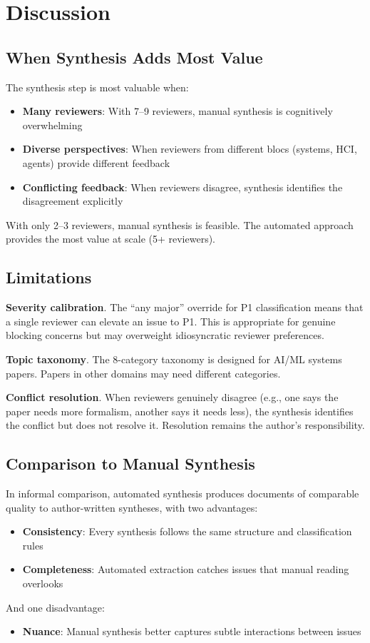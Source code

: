 \section{Discussion}

\subsection{When Synthesis Adds Most Value}

The synthesis step is most valuable when:
\begin{itemize}
    \item \textbf{Many reviewers}: With 7--9 reviewers, manual synthesis is cognitively overwhelming
    \item \textbf{Diverse perspectives}: When reviewers from different blocs (systems, HCI, agents) provide different feedback
    \item \textbf{Conflicting feedback}: When reviewers disagree, synthesis identifies the disagreement explicitly
\end{itemize}

With only 2--3 reviewers, manual synthesis is feasible. The automated approach provides the most value at scale (5+ reviewers).

\subsection{Limitations}

\textbf{Severity calibration}. The ``any major'' override for P1 classification means that a single reviewer can elevate an issue to P1. This is appropriate for genuine blocking concerns but may overweight idiosyncratic reviewer preferences.

\textbf{Topic taxonomy}. The 8-category taxonomy is designed for AI/ML systems papers. Papers in other domains may need different categories.

\textbf{Conflict resolution}. When reviewers genuinely disagree (e.g., one says the paper needs more formalism, another says it needs less), the synthesis identifies the conflict but does not resolve it. Resolution remains the author's responsibility.

\subsection{Comparison to Manual Synthesis}

In informal comparison, automated synthesis produces documents of comparable quality to author-written syntheses, with two advantages:
\begin{itemize}
    \item \textbf{Consistency}: Every synthesis follows the same structure and classification rules
    \item \textbf{Completeness}: Automated extraction catches issues that manual reading overlooks
\end{itemize}

And one disadvantage:
\begin{itemize}
    \item \textbf{Nuance}: Manual synthesis better captures subtle interactions between issues
\end{itemize}
